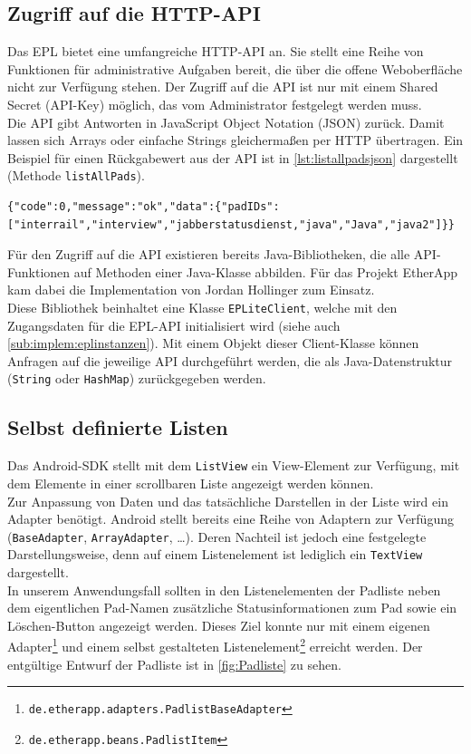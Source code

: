 \subsection{Zugriff auf die HTTP-API}
Das EPL bietet eine umfangreiche HTTP-API an.
Sie stellt eine Reihe von Funktionen für administrative Aufgaben bereit, die über die offene Weboberfläche nicht zur Verfügung stehen.
Der Zugriff auf die API ist nur mit einem Shared Secret (API-Key) möglich, das vom Administrator festgelegt werden muss.\\
Die API gibt Antworten in JavaScript Object Notation (JSON) zurück.
Damit lassen sich Arrays oder einfache Strings gleichermaßen per HTTP übertragen.
Ein Beispiel für einen Rückgabewert aus der API ist in \autoref{lst:listallpadsjson} dargestellt (Methode \texttt{listAllPads}).
\begin{lstlisting}[caption=Rückgabewert der API zur Methode listAllPads,label=lst:listallpadsjson]
{"code":0,"message":"ok","data":{"padIDs":["interrail","interview","jabberstatusdienst,"java","Java","java2"]}}
\end{lstlisting}

Für den Zugriff auf die API existieren bereits Java-Bibliotheken, die alle API-Funktionen auf Methoden einer Java-Klasse abbilden.
Für das Projekt EtherApp kam dabei die Implementation von Jordan Hollinger zum Einsatz.\\
Diese Bibliothek beinhaltet eine Klasse \texttt{EPLiteClient}, welche mit den Zugangsdaten für die EPL-API initialisiert wird (siehe auch \autoref{sub:implem:eplinstanzen}).
Mit einem Objekt dieser Client-Klasse können Anfragen auf die jeweilige API durchgeführt werden, die als Java-Datenstruktur (\texttt{String} oder \texttt{HashMap}) zurückgegeben werden.

\subsection{Selbst definierte Listen}
Das Android-SDK stellt mit dem \texttt{ListView} ein View-Element zur Verfügung, mit dem Elemente in einer scrollbaren Liste angezeigt werden können.\\
Zur Anpassung von Daten und das tatsächliche Darstellen in der Liste wird ein Adapter benötigt.
Android stellt bereits eine Reihe von Adaptern zur Verfügung (\texttt{BaseAdapter}, \texttt{ArrayAdapter}, …).
Deren Nachteil ist jedoch eine festgelegte Darstellungsweise, denn auf einem Listenelement ist lediglich ein \texttt{TextView} dargestellt.\\
In unserem Anwendungsfall sollten in den Listenelementen der Padliste neben dem eigentlichen Pad-Namen zusätzliche Statusinformationen zum Pad sowie ein Löschen-Button angezeigt werden.
Dieses Ziel konnte nur mit einem eigenen Adapter\footnote{\texttt{de.etherapp.adapters.PadlistBaseAdapter}} und einem selbst gestalteten Listenelement\footnote{\texttt{de.etherapp.beans.PadlistItem}} erreicht werden.
Der entgültige Entwurf der Padliste ist in \autoref{fig:Padliste} zu sehen.


